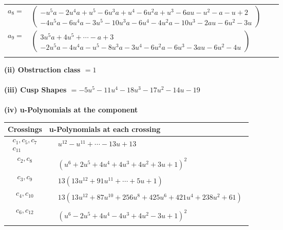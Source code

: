 \documentclass[1p]{elsarticle_modified}
\theoremstyle{definition}
\begin{document}
\begin{tabular}{m{7pt} m{180pt} m{7pt} m{180pt} }
\flushright $a_{8}=$&$\begin{pmatrix}- u^5 a-2 u^4 a+u^5-6 u^3 a+u^4-6 u^2 a+u^3-6 a u- u^2- a- u+2\\-4 u^5 a-6 u^4 a-3 u^5-10 u^3 a-6 u^4-4 u^2 a-10 u^3-2 a u-6 u^2-3 u\end{pmatrix}$ \\
\flushright $a_{9}=$&$\begin{pmatrix}3 u^5 a+4 u^5+\cdots- a+3\\-2 u^5 a-4 u^4 a- u^5-8 u^3 a-3 u^4-6 u^2 a-6 u^3-3 a u-6 u^2-4 u\end{pmatrix}$\\&\end{tabular}
\flushleft \textbf{(ii) Obstruction class $= 1$}\\~\\
\flushleft \textbf{(iii) Cusp Shapes $= -5 u^5-11 u^4-18 u^3-17 u^2-14 u-19$}\\~\\
\newpage\renewcommand{\arraystretch}{1}
\flushleft \textbf{(iv) u-Polynomials at the component}\newline \\
\begin{tabular}{m{50pt}|m{274pt}}
Crossings & \hspace{64pt}u-Polynomials at each crossing \\
\hline $$\begin{aligned}c_{1},c_{5},c_{7}\\c_{11}\end{aligned}$$&$\begin{aligned}
&u^{12}- u^{11}+\cdots-13 u+13
\end{aligned}$\\
\hline $$\begin{aligned}c_{2},c_{8}\end{aligned}$$&$\begin{aligned}
&(u^6+2 u^5+4 u^4+4 u^3+4 u^2+3 u+1)^2
\end{aligned}$\\
\hline $$\begin{aligned}c_{3},c_{9}\end{aligned}$$&$\begin{aligned}
&13(13 u^{12}+91 u^{11}+\cdots+5 u+1)
\end{aligned}$\\
\hline $$\begin{aligned}c_{4},c_{10}\end{aligned}$$&$\begin{aligned}
&13(13 u^{12}+87 u^{10}+256 u^8+425 u^6+421 u^4+238 u^2+61)
\end{aligned}$\\
\hline $$\begin{aligned}c_{6},c_{12}\end{aligned}$$&$\begin{aligned}
&(u^6-2 u^5+4 u^4-4 u^3+4 u^2-3 u+1)^2
\end{aligned}$\\
\hline
\end{tabular}\\~\\
\end{document}
